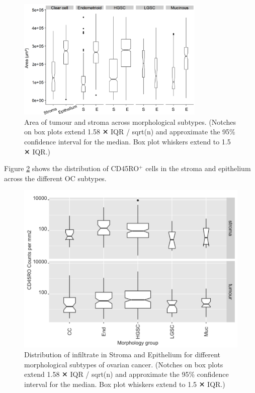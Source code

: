 \begin{figure}
    \centering
    \includegraphics[width=0.8\textwidth]{Chapter2/Figs/Raster/Morphology_area.png}
    \caption{Area of tumour and stroma across morphological subtypes. (Notches on box plots extend 1.58 ✕ IQR / sqrt(n) and approximate the 95\% confidence interval for the median. Box plot whiskers extend to 1.5 ✕ IQR.) }
    \label{fig:morph_area}
\end{figure}

Figure \ref{fig:morph_immune} shows the distribution of CD45RO$^+$ cells in the stroma and epithelium across the different OC subtypes.

\begin{figure}
    \centering
    \includegraphics{Chapter2/Figs/Raster/CD45RO_morphology.png}
    \caption{Distribution of infiltrate in Stroma and Epithelium for different morphological subtypes of ovarian cancer. (Notches on box plots extend 1.58 ✕ IQR / sqrt(n) and approximate the 95\% confidence interval for the median. Box plot whiskers extend to 1.5 ✕ IQR.) }
    \label{fig:morph_immune}
\end{figure}

